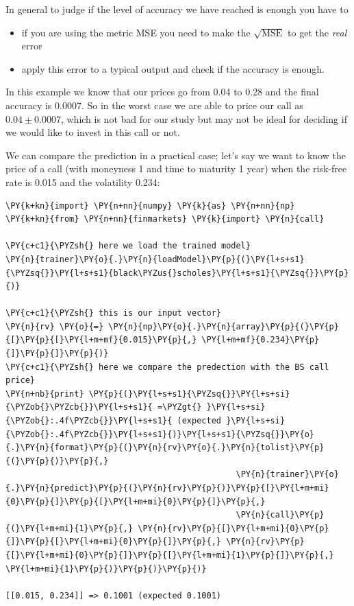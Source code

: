 In general to judge if the level of accuracy we have reached is enough
you have to

\begin{itemize}
	\tightlist
	\item
	if you are using the metric MSE you need to make the
	\(\sqrt{\mathrm{MSE}}\) to get the \emph{real} error
	\item
	apply this error to a typical output and check if the accuracy is
	enough.
\end{itemize}

In this example we know that our prices go from 0.04 to 0.28 and the
final accuracy is 0.0007. So in the
worst case we are able to price our call as \(0.04 \pm 0.0007\), which
is not bad for our study but may not be ideal for deciding if we would
like to invest in this call or not.

We can compare the prediction in a practical case; let's say we
want to know the price of a call (with moneyness 1 and time to maturity
1 year) when the risk-free rate is 0.015 and the volatility 0.234:

\begin{tcolorbox}[breakable, size=fbox, boxrule=1pt, pad at break*=1mm,colback=cellbackground, colframe=cellborder]
\begin{Verbatim}[commandchars=\\\{\}]
\PY{k+kn}{import} \PY{n+nn}{numpy} \PY{k}{as} \PY{n+nn}{np}
\PY{k+kn}{from} \PY{n+nn}{finmarkets} \PY{k}{import} \PY{n}{call}
	
\PY{c+c1}{\PYZsh{} here we load the trained model}
\PY{n}{trainer}\PY{o}{.}\PY{n}{loadModel}\PY{p}{(}\PY{l+s+s1}{\PYZsq{}}\PY{l+s+s1}{black\PYZus{}scholes}\PY{l+s+s1}{\PYZsq{}}\PY{p}{)}
	
\PY{c+c1}{\PYZsh{} this is our input vector}
\PY{n}{rv} \PY{o}{=} \PY{n}{np}\PY{o}{.}\PY{n}{array}\PY{p}{(}\PY{p}{[}\PY{p}{[}\PY{l+m+mf}{0.015}\PY{p}{,} \PY{l+m+mf}{0.234}\PY{p}{]}\PY{p}{]}\PY{p}{)}
\PY{c+c1}{\PYZsh{} here we compare the predection with the BS call price}
\PY{n+nb}{print} \PY{p}{(}\PY{l+s+s1}{\PYZsq{}}\PY{l+s+si}{\PYZob{}\PYZcb{}}\PY{l+s+s1}{ =\PYZgt{} }\PY{l+s+si}{\PYZob{}:.4f\PYZcb{}}\PY{l+s+s1}{ (expected }\PY{l+s+si}{\PYZob{}:.4f\PYZcb{}}\PY{l+s+s1}{)}\PY{l+s+s1}{\PYZsq{}}\PY{o}{.}\PY{n}{format}\PY{p}{(}\PY{n}{rv}\PY{o}{.}\PY{n}{tolist}\PY{p}{(}\PY{p}{)}\PY{p}{,} 
                                               \PY{n}{trainer}\PY{o}{.}\PY{n}{predict}\PY{p}{(}\PY{n}{rv}\PY{p}{)}\PY{p}{[}\PY{l+m+mi}{0}\PY{p}{]}\PY{p}{[}\PY{l+m+mi}{0}\PY{p}{]}\PY{p}{,} 
                                               \PY{n}{call}\PY{p}{(}\PY{l+m+mi}{1}\PY{p}{,} \PY{n}{rv}\PY{p}{[}\PY{l+m+mi}{0}\PY{p}{]}\PY{p}{[}\PY{l+m+mi}{0}\PY{p}{]}\PY{p}{,} \PY{n}{rv}\PY{p}{[}\PY{l+m+mi}{0}\PY{p}{]}\PY{p}{[}\PY{l+m+mi}{1}\PY{p}{]}\PY{p}{,} \PY{l+m+mi}{1}\PY{p}{)}\PY{p}{)}\PY{p}{)}

[[0.015, 0.234]] => 0.1001 (expected 0.1001)
\end{Verbatim}
\end{tcolorbox}

